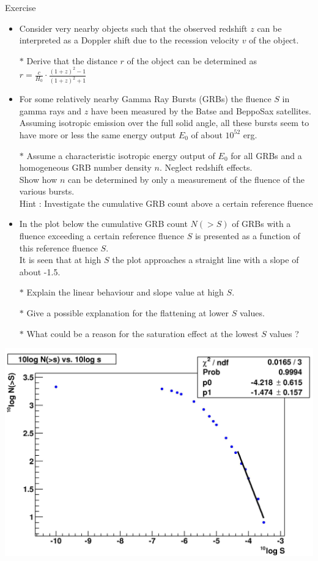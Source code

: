 \Tr
\onecolumn
{\red
\begin{center}
Exercise
\end{center}
\begin{itemize}
\item Consider very nearby objects such that the observed redshift $z$ can be interpreted
      as a Doppler shift due to the recession velocity $v$ of the object.
\item[$\ast$] Derive that the distance $r$ of the object can be determined as
              $r=\frac{c}{H_{0}} \cdot \frac{(1+z)^{2}-1}{(1+z)^{2}+1}$
\item For some relatively nearby Gamma Ray Bursts (GRBs) the fluence $S$ in gamma rays and $z$
      have been measured by the Batse and BeppoSax satellites.
      Assuming isotropic emission over the full solid angle, all these bursts seem to have
      more or less the same energy output $E_{0}$ of about $10^{52}$ erg.
\item[$\ast$] Assume a characteristic isotropic energy output of $E_{0}$ for all GRBs and a
              homogeneous GRB number density $n$. Neglect redshift effects.\\
              Show how $n$ can be determined by only a measurement of the fluence of the various bursts.\\
              {\black Hint : Investigate the cumulative GRB count above a certain reference fluence}
\item In the plot below the cumulative GRB count $N(>S)$ of GRBs with a fluence exceeding a certain reference fluence $S$
      is presented as a function of this reference fluence $S$.\\
      It is seen that at high $S$ the plot approaches a straight line with a slope of about -1.5.
%
\newpage
%
\item[$\ast$] Explain the linear behaviour and slope value at high $S$.
\item[$\ast$] Give a possible explanation for the flattening at lower $S$ values.
\item[$\ast$] What could be a reason for the saturation effect at the lowest $S$ values ?
\end{itemize}
}%
%
\begin{center}
\includegraphics[keepaspectratio,width=15cm]{batse-n-s}
\end{center}


